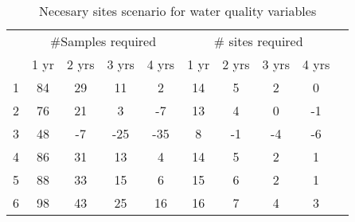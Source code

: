 \begin{table}[htbp]
\centering
\caption{Necesary sites scenario for water quality variables}
\begin{tabular}{ccccc|ccccc}
\toprule
\multicolumn{1}{c}{} &   \multicolumn{4}{c}{ \#Samples required} & \multicolumn{4}{c}{\# sites required} \\ \cline{2-9}\noalign{\smallskip}
\multicolumn{1}{p{3cm}}{Elevation Bands}  & 1 yr  & 2 yrs   & 3 yrs    & 4 yrs   & 1 yr   & 2 yrs  & 3 yrs  & 4 yrs\\ \midrule
1 &  84 & 29 & 11   & 2    & 14 & 5  & 2   & 0 \\ 
2  & 76 & 21 & 3     & -7   & 13 & 4  & 0   & -1 \\ 
3 &  48 & -7  & -25 & -35 & 8   & -1 & -4 & -6 \\
4 &  86 & 31 & 13  & 4     & 14 & 5  & 2  & 1 \\ 
5 &  88 & 33 & 15  & 6     & 15 & 6  & 2  & 1 \\ 
6 &  98 & 43 & 25  & 16   & 16 & 7  & 4  & 3 \\ \bottomrule
\end{tabular}
\label{tab:WQapsenario}
\end{table}